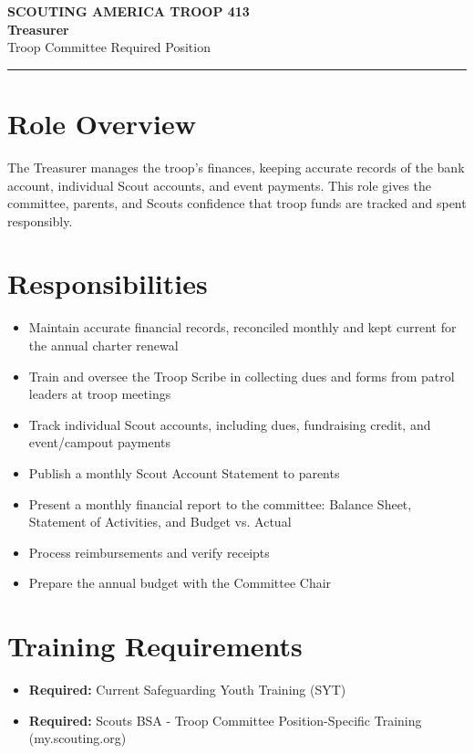 \documentclass[11pt, letterpaper]{article}
\begin{document}
\begin{center}
  {\small\color{scoutgreen}\textbf{SCOUTING AMERICA \textbullet{} TROOP 413}} \\[4pt]
  {\fontsize{20pt}{24pt}\selectfont\bfseries\color{scoutgreen} Treasurer} \\[4pt]
  {\large\color{accent} Troop Committee \textbullet{} Required Position} \\[4pt]
  \textcolor{accent}{\rule{0.6\linewidth}{1pt}}
\end{center}

\vspace{0.3em}

\begin{minipage}[t]{0.48\linewidth}
\raggedright

\section{Role Overview}
The Treasurer manages the troop's finances, keeping accurate records of the bank account, individual Scout accounts, and event payments. This role gives the committee, parents, and Scouts confidence that troop funds are tracked and spent responsibly.

\vspace{0.4em}
\section{Responsibilities}
\begin{itemize}
  \item Maintain accurate financial records, reconciled monthly and kept current for the annual charter renewal
  \item Train and oversee the Troop Scribe in collecting dues and forms from patrol leaders at troop meetings
  \item Track individual Scout accounts, including dues, fundraising credit, and event/campout payments
  \item Publish a monthly Scout Account Statement to parents
  \item Present a monthly financial report to the committee: Balance Sheet, Statement of Activities, and Budget vs. Actual
  \item Process reimbursements and verify receipts
  \item Prepare the annual budget with the Committee Chair
\end{itemize}

\section{Training Requirements}
\begin{itemize}
  \item \textbf{Required:} Current Safeguarding Youth Training (SYT)
  \item \textbf{Required:} Scouts BSA - Troop Committee Position-Specific Training (my.scouting.org)
\end{itemize}

\end{minipage}
\end{document}
